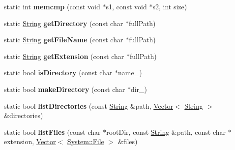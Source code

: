 \begin{DoxyCompactItemize}
\item 
static int {\bfseries memcmp} (const void $\ast$s1, const void $\ast$s2, int size)\hypertarget{class_i_dream_sky_1_1_system_a427eeddcacbeb63ee4f82544a56dfd3f}{}\label{class_i_dream_sky_1_1_system_a427eeddcacbeb63ee4f82544a56dfd3f}

\item 
static \hyperlink{class_i_dream_sky_1_1_string}{String} {\bfseries get\+Directory} (const char $\ast$full\+Path)\hypertarget{class_i_dream_sky_1_1_system_abd846b013a800d9fcd8a4f916e2026f2}{}\label{class_i_dream_sky_1_1_system_abd846b013a800d9fcd8a4f916e2026f2}

\item 
static \hyperlink{class_i_dream_sky_1_1_string}{String} {\bfseries get\+File\+Name} (const char $\ast$full\+Path)\hypertarget{class_i_dream_sky_1_1_system_aa7fb6455a059789dd5e4bb333327f139}{}\label{class_i_dream_sky_1_1_system_aa7fb6455a059789dd5e4bb333327f139}

\item 
static \hyperlink{class_i_dream_sky_1_1_string}{String} {\bfseries get\+Extension} (const char $\ast$full\+Path)\hypertarget{class_i_dream_sky_1_1_system_a7dac7fcbbaff6b6e16e68209eaf25c05}{}\label{class_i_dream_sky_1_1_system_a7dac7fcbbaff6b6e16e68209eaf25c05}

\item 
static bool {\bfseries is\+Directory} (const char $\ast$name\+\_\+)\hypertarget{class_i_dream_sky_1_1_system_aed72765800d117c178ff3c846abd813b}{}\label{class_i_dream_sky_1_1_system_aed72765800d117c178ff3c846abd813b}

\item 
static bool {\bfseries make\+Directory} (const char $\ast$dir\+\_\+)\hypertarget{class_i_dream_sky_1_1_system_abfc5bc6c40fc568b79008fc4bf64fa54}{}\label{class_i_dream_sky_1_1_system_abfc5bc6c40fc568b79008fc4bf64fa54}

\item 
static bool {\bfseries list\+Directories} (const \hyperlink{class_i_dream_sky_1_1_string}{String} \&path, \hyperlink{class_i_dream_sky_1_1_vector}{Vector}$<$ \hyperlink{class_i_dream_sky_1_1_string}{String} $>$ \&directories)\hypertarget{class_i_dream_sky_1_1_system_abd7aed6e3777db04a46045adb9333771}{}\label{class_i_dream_sky_1_1_system_abd7aed6e3777db04a46045adb9333771}

\item 
static bool {\bfseries list\+Files} (const char $\ast$root\+Dir, const \hyperlink{class_i_dream_sky_1_1_string}{String} \&path, const char $\ast$extension, \hyperlink{class_i_dream_sky_1_1_vector}{Vector}$<$ \hyperlink{class_i_dream_sky_1_1_system_1_1_file}{System\+::\+File} $>$ \&files)\hypertarget{class_i_dream_sky_1_1_system_a26f078a49a4369626fb039ddc781fb9e}{}\label{class_i_dream_sky_1_1_system_a26f078a49a4369626fb039ddc781fb9e}


\end{DoxyCompactItemize}
